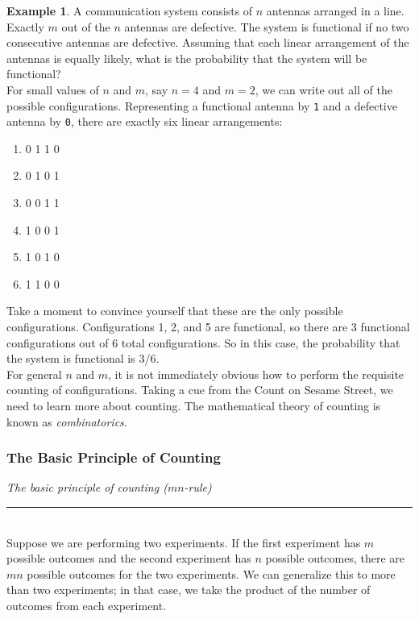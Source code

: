 \documentclass[12pt]{article}
\theoremstyle{definition}
\newtheorem*{example}{Example}
\theoremstyle{remark}
\begin{document}
\begin{example}A communication system consists of $n$ antennas arranged in a line. Exactly $m$ out of the $n$ antennas are defective. The system is functional if no two consecutive antennas are defective. Assuming that each linear arrangement of the antennas is equally likely, what is the probability that the system will be functional?\\

For small values of $n$ and $m$, say $n = 4$ and $m = 2$, we can write out all of the possible configurations. Representing a functional antenna by \texttt{1} and a defective antenna by \texttt{0}, there are exactly six linear arrangements:
\begin{enumerate}[noitemsep]
\item 0 1 1 0
\item 0 1 0 1
\item 0 0 1 1
\item 1 0 0 1
\item 1 0 1 0
\item 1 1 0 0
\end{enumerate}
Take a moment to convince yourself that these are the only possible configurations. Configurations 1, 2, and 5 are functional, so there are 3 functional configurations out of 6 total configurations. So in this case, the probability that the system is functional is 3/6. \\

For general $n$ and $m$, it is not immediately obvious how to perform the requisite counting of configurations. Taking a cue from the Count on Sesame Street, we need to learn more about counting. The mathematical theory of counting is known as \emph{combinatorics}.
\end{example}

\subsubsection{The Basic Principle of Counting}

\begin{framed}
  \emph{The basic principle of counting ($mn$-rule) }\\
  \rule{\dimexpr{}\fboxrule}{.1pt} \\
  Suppose we are performing two experiments. If the first experiment has $m$ possible outcomes and the second experiment has $n$ possible outcomes, there are $mn$ possible outcomes for the two experiments. We can generalize this to more than two experiments; in that case, we take the product of the number of outcomes from each experiment.
\end{framed}
\end{document}
